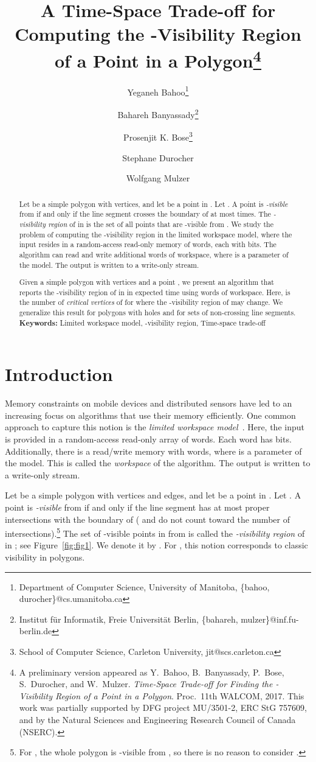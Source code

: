 \documentclass[11pt, a4paper]{article}
\title{A Time-Space Trade-off for Computing the -Visibility 
Region of a Point in a Polygon\footnote{
A preliminary version appeared as 
Y.~Bahoo, B.~Banyassady, P.~Bose, S.~Durocher, and 
W.~Mulzer. \emph{Time-Space Trade-off for Finding 
the -Visibility Region of a Point in a Polygon}. Proc.~11th WALCOM, 
2017.  This work was partially 
supported by DFG project MU/3501-2, ERC StG 757609, and by the 
Natural Sciences and Engineering Research Council of Canada (NSERC).}}
\author{Yeganeh Bahoo\thanks{Department of Computer Science,
        University of Manitoba, \{bahoo, durocher\}@cs.umanitoba.ca}
        \and
        Bahareh Banyassady\thanks{Institut f\"ur Informatik, Freie 
	Universit\"at Berlin,
        {\{bahareh, mulzer\}@inf.fu-berlin.de}}
        \and
        Prosenjit K. Bose\thanks{School of Computer Science,
        Carleton University, {jit@scs.carleton.ca}}
        \and 
        Stephane Durocher
        \and 
        Wolfgang Mulzer
        }
\date{}
\begin{document}
\maketitle

\begin{abstract}
Let  be a simple polygon with  vertices, and let 
 be a point in . Let . 
A point  is \emph{-visible} from  
if and only if the line segment  crosses the 
boundary of  at most  times. The \emph{-visibility 
region} of  in  is the set of all points that 
are -visible from .  We study the problem of 
computing the -visibility region in the 
limited workspace model, where the input resides 
in a random-access read-only memory of  words, 
each with  bits. The algorithm can read 
and write  additional words of workspace, 
where  is a parameter of the model. The 
output is written to a write-only stream. 

Given a simple polygon  with  vertices and 
a point , we present an
algorithm that reports the -visibility region 
of  in  in  
expected time using  words of workspace. 
Here,  is the number of 
\emph{critical vertices} of  for  where the 
-visibility region of  may change. We 
generalize this result for polygons with holes 
and for sets of non-crossing line segments.\\
\linebreak\textbf{Keywords:} Limited workspace model, 
-visibility region, 
Time-space trade-off
\end{abstract}

\section{Introduction}
Memory constraints on mobile devices and 
distributed sensors have led to an increasing 
focus on algorithms that use their memory 
efficiently. One common approach to capture 
this notion is the \emph{limited workspace model}~\cite{asano2013memory}. 
Here, the input is provided in a random-access read-only 
array of  words. Each word has 
 bits. Additionally, there is a 
read/write memory with  words, where 
 is a parameter of the model. 
This is called the \emph{workspace} of the 
algorithm. The output is written to a write-only 
stream. 

Let  be a simple polygon with  vertices and  edges,
and let  be a point in . Let
.
A point  is \emph{-visible} from  
if and only if the line segment  has at most 
 proper intersections with the boundary 
 of  ( and  do not count toward
the number of intersections).\footnote{For , the
whole polygon is -visible from , so there is no
reason to consider .} The set of -visible 
points in  from  is called the 
\emph{-visibility region} of  in ;
see Figure~\ref{fig:fig1}.
We denote it by . For , this 
notion corresponds to classic visibility in polygons. 
\end{document}
